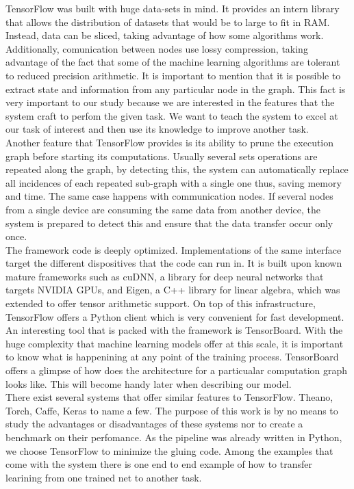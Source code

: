 TensorFlow was built with huge data-sets in mind. It provides an intern library that allows the distribution of datasets that would be to large to fit in RAM. Instead, data can be sliced, taking advantage of how some algorithms work. Additionally, comunication between nodes use lossy compression, taking advantage of the fact that some of the machine learning algorithms are tolerant to reduced precision arithmetic. It is important to mention that it is possible to extract state and information from any particular node in the graph. This fact is very important to our study because we are interested in the features that the system craft to perfom the given task. We want to teach the system to excel at our task of interest and then use its knowledge to improve another task.\\

Another feature that TensorFlow provides is its ability to prune the execution graph before starting its computations. Usually several sets operations are repeated along the graph, by detecting this, the system can automatically replace all incidences of each repeated sub-graph with a single one thus, saving memory and time. The same case happens with communication nodes. If several nodes from a single device are consuming the same data from another device, the system is prepared to detect this and ensure that the data transfer occur only once.\\

The framework code is deeply optimized. Implementations of the same interface target the different dispositives that the code can run in. It is built upon known mature frameworks such as cuDNN, a library for deep neural networks that targets NVIDIA GPUs, and Eigen, a C++ library for linear algebra, which was extended to offer tensor arithmetic support. On top of this infrastructure, TensorFlow offers a Python client which is very convenient for fast development.\\

An interesting tool that is packed with the framework is TensorBoard. With the huge complexity that machine learning models offer at this scale, it is important to know what is happenining at any point of the training process. TensorBoard offers a glimpse of how does the architecture for a particualar computation graph looks like. This will become handy later when describing our model.\\

There exist several systems that offer similar features to TensorFlow. Theano, Torch, Caffe, Keras to name a few. The purpose of this work is by no means to study the advantages or disadvantages of these systems nor to create a benchmark on their perfomance. As the pipeline was already written in Python, we choose TensorFlow to minimize the gluing code. Among the examples that come with the system there is one end to end example of how to transfer learining from one trained net to another task.\\











